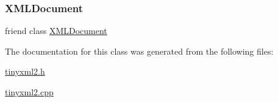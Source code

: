 \subsubsection{\texorpdfstring{X\+M\+L\+Document}{XMLDocument}}
{\footnotesize\ttfamily friend class \hyperlink{classtinyxml2_1_1_x_m_l_document}{X\+M\+L\+Document}\hspace{0.3cm}{\ttfamily [friend]}}



The documentation for this class was generated from the following files\+:\begin{DoxyCompactItemize}
\item 
\hyperlink{tinyxml2_8h}{tinyxml2.\+h}\item 
\hyperlink{tinyxml2_8cpp}{tinyxml2.\+cpp}\end{DoxyCompactItemize}
